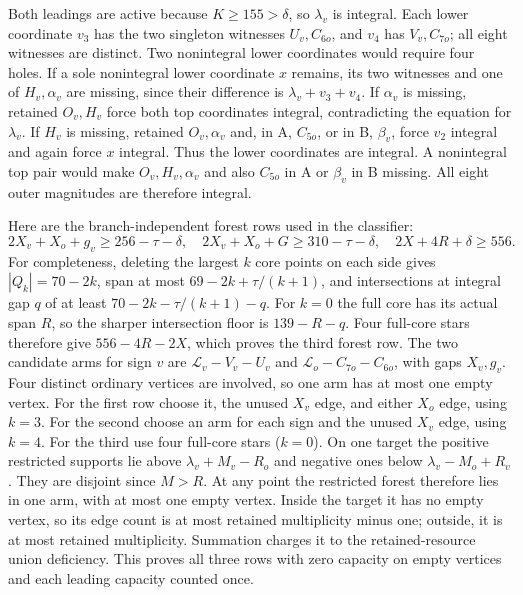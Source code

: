 \documentclass[11pt,letterpaper]{article}
\theoremstyle{definition}\newtheorem{definition}[theorem]{Definition}
\begin{document}
Both leadings are active because $K\ge155>\delta$, so $\lambda_v$ is
integral. Each lower coordinate $v_3$ has the two singleton witnesses
$U_v,C_{6o}$, and $v_4$ has $V_v,C_{7o}$; all eight witnesses are distinct.
Two nonintegral lower coordinates would require four holes. If a sole
nonintegral lower coordinate $x$ remains, its two witnesses and one of
$H_v,\alpha_v$ are missing, since their difference is
$\lambda_v+v_3+v_4$. If $\alpha_v$ is missing, retained $O_v,H_v$ force
both top coordinates integral, contradicting the equation for $\lambda_v$.
If $H_v$ is missing, retained $O_v,\alpha_v$ and, in A, $C_{5o}$,
or in B, $\beta_v$, force $v_2$ integral and again force $x$ integral.
Thus the lower coordinates are integral. A nonintegral top pair would
make $O_v,H_v,\alpha_v$ and also $C_{5o}$ in A or $\beta_v$ in B missing.
All eight outer magnitudes are therefore integral.

Here are the branch-independent forest rows used in the classifier:
\begin{equation}\label{eq:p3-classifier-forests}
2X_v+X_o+g_v\ge256-\tau-\delta,\quad
2X_v+X_o+G\ge310-\tau-\delta,\quad
2X+4R+\delta\ge556.
\end{equation}
For completeness, deleting the largest $k$ core points on each side gives
$|Q_k|=70-2k$, span at most $69-2k+\tau/(k+1)$, and intersections at
integral gap $q$ of at least $70-2k-\tau/(k+1)-q$. For $k=0$ the full core has its actual span $R$, so the sharper intersection floor is $139-R-q$. Four full-core stars therefore give $556-4R-2X$, which proves the third forest row.
The two candidate arms for sign $v$ are
$\mathcal L_v-V_v-U_v$ and $\mathcal L_o-C_{7o}-C_{6o}$,
with gaps $X_v,g_v$. Four distinct ordinary vertices are involved, so
one arm has at most one empty vertex. For the first row choose it,
the unused $X_v$ edge, and either $X_o$ edge, using $k=3$.
For the second choose an arm for each sign and the unused $X_v$ edge,
using $k=4$. For the third use four full-core stars ($k=0$).
On one target the positive restricted supports lie above
$\lambda_v+M_v-R_o$ and negative ones below $\lambda_v-M_o+R_v$.
They are disjoint since $M>R$. At any point the restricted forest
therefore lies in one arm, with at most one empty vertex. Inside the
target it has no empty vertex, so its edge count is at most retained
multiplicity minus one; outside, it is at most retained multiplicity.
Summation charges it to the retained-resource union deficiency. This
proves all three rows with zero capacity on empty vertices and each
leading capacity counted once.
\end{document}
